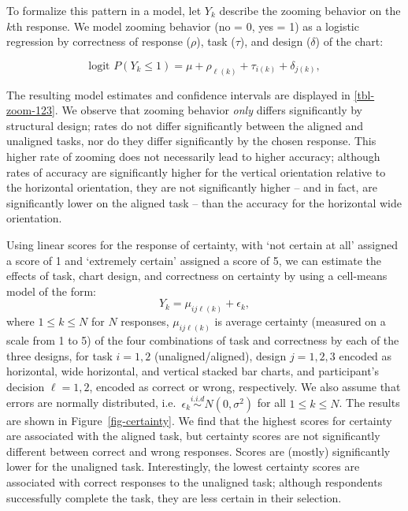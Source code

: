 \documentclass[
]{jds}
\begin{document}
To formalize this pattern in a model, let \(Y_k\) describe the zooming
behavior on the \(k\)th response. We model zooming behavior (no = 0, yes
= 1) as a logistic regression by correctness of response (\(\rho\)),
task (\(\tau\)), and design (\(\delta\)) of the chart:

\begin{equation}
\text{logit } P(Y_k \le 1) = \mu + \rho_{\ell(k)} + \tau_{i(k)} + \delta_{j(k)},
\end{equation}

The resulting model estimates and confidence intervals are displayed in
\autoref{tbl-zoom-123}. We observe that zooming behavior \emph{only}
differs significantly by structural design; rates do not differ
significantly between the aligned and unaligned tasks, nor do they
differ significantly by the chosen response. This higher rate of zooming
does not necessarily lead to higher accuracy; although rates of accuracy
are significantly higher for the vertical orientation relative to the
horizontal orientation, they are not significantly higher -- and in
fact, are significantly lower on the aligned task -- than the accuracy
for the horizontal wide orientation.

Using linear scores for the response of certainty, with `not certain at
all' assigned a score of 1 and `extremely certain' assigned a score of
5, we can estimate the effects of task, chart design, and correctness on
certainty by using a cell-means model of the form: \begin{equation}
Y_{k} = \mu_{ij\ell(k)} + \epsilon_{k},
\end{equation} where \(1 \le k \le N\) for \(N\) responses,
\(\mu_{ij\ell(k)}\) is average certainty (measured on a scale from 1 to
5) of the four combinations of task and correctness by each of the three
designs, for task \(i = 1, 2\) (unaligned/aligned), design \(j=1, 2, 3\)
encoded as horizontal, wide horizontal, and vertical stacked bar charts,
and participant's decision \(\ell = 1, 2\), encoded as correct or wrong,
respectively. We also assume that errors are normally distributed,
i.e.~\(\epsilon_k \stackrel{i.i.d}{\sim} N(0, \sigma^2)\) for all
\(1 \le k \le N\). The results are shown in Figure~\ref{fig-certainty}.
We find that the highest scores for certainty are associated with the
aligned task, but certainty scores are not significantly different
between correct and wrong responses. Scores are (mostly) significantly
lower for the unaligned task. Interestingly, the lowest certainty scores
are associated with correct responses to the unaligned task; although
respondents successfully complete the task, they are less certain in
their selection.
\end{document}
